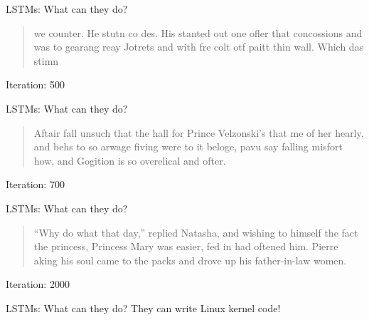 \begin{slide}{LSTMs: What can they do?}
  \begin{quote}
    we counter. He stutn co des. His stanted out one ofler that concossions and was to gearang reay Jotrets and with fre colt otf paitt thin wall. Which das stimn
  \end{quote}
  \vspace{0.25cm}
  Iteration: 500
\begin{flushleft}\cite{lstm}\end{flushleft}
\end{slide}

\begin{slide}{LSTMs: What can they do?}
  \begin{quote}
    Aftair fall unsuch that the hall for Prince Velzonski's that me of
    her hearly, and behs to so arwage fiving were to it beloge, pavu say falling misfort
    how, and Gogition is so overelical and ofter.
  \end{quote}
  \vspace{0.25cm}
  Iteration: 700
\begin{flushleft}\cite{lstm}\end{flushleft}
\end{slide}

\begin{slide}{LSTMs: What can they do?}
  \begin{quote}
    ``Why do what that day,'' replied Natasha, and wishing to himself the fact the princess, Princess Mary was easier, fed in had oftened him. Pierre aking his soul came to the packs and drove up his father-in-law women.
  \end{quote}
  \vspace{0.25cm}
  Iteration: 2000
\begin{flushleft}\cite{lstm}\end{flushleft}
\end{slide}

\begin{slide}{LSTMs: What can they do?}
  {
    \huge
    They can write Linux kernel code!
  }
\end{slide}
